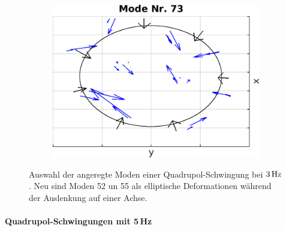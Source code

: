 \begin{figure}[!t]
\begin{subfigure}[t]{0.325\textwidth}
                \includegraphics[width=\textwidth,height=0.7\textwidth]{figs/auswertung/manipulation/quadrupol3HzModeNr73.png}
              \end{subfigure}
              \caption{Auswahl der angeregte Moden einer Quadrupol-Schwingung bei $\unit[3]{Hz}$. Neu sind Moden 52 un 55 als elliptische Deformationen während der Auslenkung auf einer Achse.}\label{img:modenquadrupol3Hz}
            \end{figure}

        \paragraph{Quadrupol-Schwingungen mit 5\,Hz}

